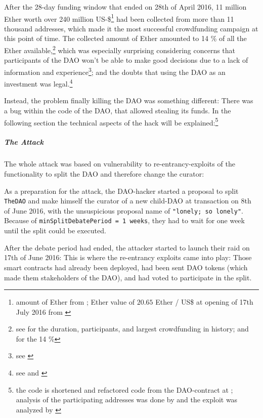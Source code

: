 After the 28-day funding window that ended on 28th of April 2016, 11 million Ether worth over 240 million US-\$\footnote{amount of Ether from \cite{etherscan:dao:balancebefore}; Ether value of \( 20.65 \) Ether / US\$ at opening of 17th July 2016 from \cite{coinmarketcap:ethervaluedao}} had been collected from more than 11 thousand addresses, which made it the most successful crowdfunding campaign at this point of time. The collected amount of Ether amounted to 14 \% of all the Ether available,\footnote{see \cite{coindesk:daohackjournalists} for the duration, participants, and largest crowdfunding in history; and \cite{economist:dao} for the 14 \%} which was especially surprising considering concerns that participants of the DAO won't be able to make good decisions due to a lack of information and experience\footnote{see \cite{technologyreview:daocriticism}}; and the doubts that using the DAO as an investment was legal.\footnote{see \cite{americanbanker:legalcriticism} and \cite{coindesk:daohackjournalists}}

Instead, the problem finally killing the DAO was something different: There was a bug within the code of the DAO, that allowed stealing its funds. In the following section the technical aspects of the hack will be explained:\footnote{the code is shortened and refactored code from the DAO-contract at \cite{etherscan:dao}; analysis of the participating addresses was done by \cite{pfeffer:attackstory} and the exploit was analyzed by \cite{hackingdistributed:analysisdaoexploit}}

\subparagraph{The Attack}
The whole attack was based on vulnerability to re-entrancy-exploits of the functionality to split the DAO and therefore change the curator:

As a preparation for the attack, the DAO-hacker started a proposal to split \texttt{TheDAO} and make himself the curator of a new child-DAO at transaction \cite{etherscan:lonelysolonely} on 8th of June 2016, with the unsuspicious proposal name of  \texttt{"lonely; so lonely"}. Because of \texttt{minSplitDebatePeriod = 1 weeks}, they had to wait for one week until the split could be executed.

After the debate period had ended, the attacker started to launch their raid on 17th of June 2016: This is where the re-entrancy exploits came into play: Those smart contracts had already been deployed, had been sent DAO tokens (which made them stakeholders of the DAO), and had voted to participate in the split.

